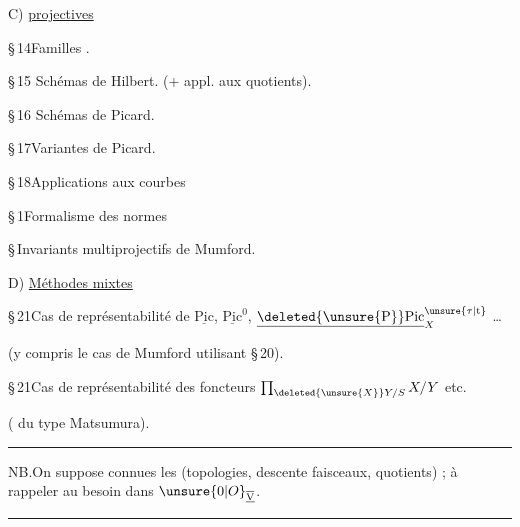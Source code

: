 \noindent{}
\clearpage
{}

C) \uline{  projectives}

\S\,14\quad Familles .

\S\,15\quad {} Schémas de Hilbert. (+ appl. aux quotients).

\S\,16\quad {} Schémas de Picard.

\S\,17\quad Variantes de Picard.

\S\,18\quad Applications aux courbes

\S\,1\quad Formalisme des normes

\S\,\quad Invariants multiprojectifs de Mumford.

D) \uline{Méthodes  mixtes}

\S\,21\quad Cas de représentabilité de $\underline{\mathrm{Pic}}$, $\underline{\mathrm{Pic}}^{0}$, $\underline{\deleted{\unsure{\mathrm P}}\mathrm{Pic}}_{X}^{\unsure{\tau|\mathrm t}}$ \ldots

(y compris le cas de Mumford utilisant \S\,20).

\S\,21\quad Cas de représentabilité des foncteurs $\prod_{\deleted{\unsure{X}}Y/S}X/Y$ etc.

( du type Matsumura).

\noindent\rule{\linewidth}{.3pt}

NB.\quad On suppose connues  les   (topologies, descente faisceaux, quotients) ; à rappeler au besoin dans $\unsure{0|O}_{\underline{\overline{\mathrm V}}}$.

\noindent\rule{\linewidth}{.3pt}

